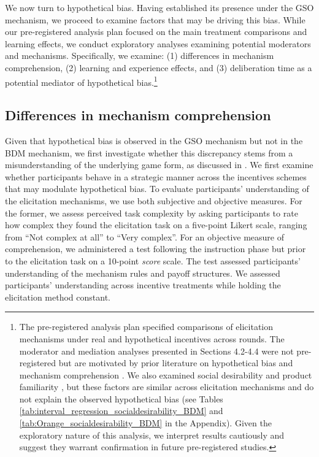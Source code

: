 \documentclass[12pt]{article}
\begin{document}
We now turn to hypothetical bias. Having established its presence under the GSO mechanism, we proceed to examine factors that may be driving this bias. While our pre-registered analysis plan focused on the main treatment comparisons and learning effects, we conduct exploratory analyses examining potential moderators and mechanisms. Specifically, we examine: (1) differences in mechanism comprehension, (2) learning and experience effects, and (3) deliberation time as a potential mediator of hypothetical bias.\footnote{The pre-registered analysis plan specified comparisons of elicitation mechanisms under real and hypothetical incentives across rounds. The moderator and mediation analyses presented in Sections 4.2-4.4 were not pre-registered but are motivated by prior literature on hypothetical bias \citep{sims2003implications} and mechanism comprehension \citep{cason_misconceptions_2014}. We also examined social desirability \citep{norwood2011social, entem2022using, lopez2021social, bursztyn2025social} and product familiarity \citep{veettil_hypothetical_2024}, but these factors are similar across elicitation mechanisms and do not explain the observed hypothetical bias (see Tables \ref{tab:interval_regression_socialdesirability_BDM} and \ref{tab:Orange_socialdesirability_BDM} in the Appendix). Given the exploratory nature of this analysis, we interpret results cautiously and suggest they warrant confirmation in future pre-registered studies.}

\subsection{Differences in mechanism comprehension}
Given that hypothetical bias is observed in the GSO mechanism but not in the BDM mechanism, we first investigate whether this discrepancy stems from a misunderstanding of the underlying game form, as discussed in \citet{cason_misconceptions_2014}. We first examine whether participants behave in a strategic manner across the incentives schemes that may modulate hypothetical bias.
To evaluate participants’ understanding of the elicitation mechanisms, we use both subjective and objective measures. For the former, we assess perceived task complexity by asking participants to rate how complex they found the elicitation task on a five-point Likert scale, ranging from “Not complex at all” to “Very complex”. 
For  an objective measure of comprehension, we administered a test following the instruction phase but prior to the elicitation task on a 10-point \textit{score} scale. The test assessed participants’ understanding of the mechanism rules and payoff structures. 
We assessed participants' understanding across incentive treatments while holding the elicitation method constant. 
\end{document}
